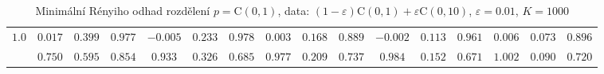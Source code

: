 \begin{table}
\begin{center}
\begin{tabular}{|c|ccc|ccc|ccc|ccc|ccc|}
\hline 
$1.0$ & $ 0.017 $ & $ 0.399 $ & $ 0.977 $ & $ -0.005 $ & $ 0.233 $ & $ 0.978 $ & $ 0.003 $ & $ 0.168 $ & $ 0.889 $ & $ -0.002 $ & $ 0.113 $ & $ 0.961 $ & $ 0.006 $ & $ 0.073 $ & $ 0.896 $\\ 
 & $ 0.750 $ & $ 0.595 $ & $ 0.854 $ & $ 0.933 $ & $ 0.326 $ & $ 0.685 $ & $ 0.977 $ & $ 0.209 $ & $ 0.737 $ & $ 0.984 $ & $ 0.152 $ & $ 0.671 $ & $ 1.002 $ & $ 0.090 $ & $ 0.720 $\\ 
\hline 
\end{tabular}
\caption{Minimální Rényiho odhad rozdělení  $p = \mathrm{C}(0,1)$, data: $(1-\varepsilon)\mathrm{C}(0,1) + \varepsilon \mathrm{C}(0,10)$, $\varepsilon =  0.01$, $K = 1000$} 
\end{center}
\end{table}
 

